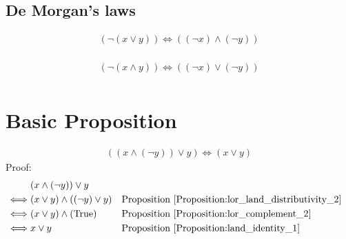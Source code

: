 \subsection{De Morgan's laws}
\begin{prop}
\label{Proposition:De_Morgan_lor}
\begin{align*}
(\lnot (x \lor y)) \iff ((\lnot x) \land (\lnot y)) \\
\end{align*}
\end{prop}

\begin{prop}
\label{Proposition:De_Morgan_land}
\begin{align*}
(\lnot (x \land y)) \iff ((\lnot x) \lor (\lnot y)) \\
\end{align*}
\end{prop}

\section{Basic Proposition}
\begin{prop}
\label{Proposition:x_lor_y_complement}
\begin{align*}
((x \land (\lnot y)) \lor y) \iff (x \lor y)
\end{align*}
Proof:
\begin{align*}
& (x \land (\lnot y)) \lor y \\
\iff & (x \lor y) \land ((\lnot y) \lor y)
&& \text{Proposition \ref{Proposition:lor_land_distributivity_2}} \\
\iff & (x \lor y) \land (\text{True})
&& \text{Proposition \ref{Proposition:lor_complement_2}} \\
\iff & x \lor y
&& \text{Proposition \ref{Proposition:land_identity_1}} \\
\end{align*}
\end{prop}

